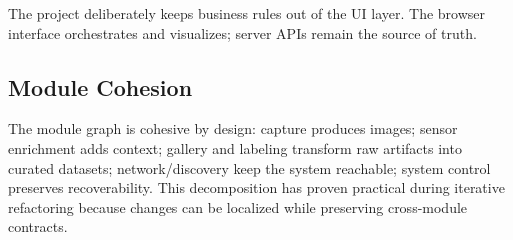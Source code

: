 The project deliberately keeps business rules out of the UI layer. The browser interface orchestrates and visualizes; server APIs remain the source of truth.

\subsection{Module Cohesion}
The module graph is cohesive by design: capture produces images; sensor enrichment adds context; gallery and labeling transform raw artifacts into curated datasets; network/discovery keep the system reachable; system control preserves recoverability. This decomposition has proven practical during iterative refactoring because changes can be localized while preserving cross-module contracts.

